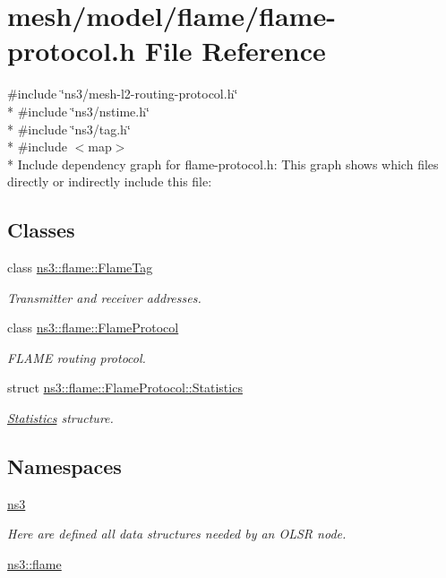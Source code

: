 \hypertarget{flame-protocol_8h}{}\section{mesh/model/flame/flame-\/protocol.h File Reference}
\label{flame-protocol_8h}
{\ttfamily \#include \char`\"{}ns3/mesh-\/l2-\/routing-\/protocol.\+h\char`\"{}}\\*
{\ttfamily \#include \char`\"{}ns3/nstime.\+h\char`\"{}}\\*
{\ttfamily \#include \char`\"{}ns3/tag.\+h\char`\"{}}\\*
{\ttfamily \#include $<$map$>$}\\*
Include dependency graph for flame-\/protocol.h\+:
This graph shows which files directly or indirectly include this file\+:
\subsection*{Classes}
\begin{DoxyCompactItemize}
\item 
class \hyperlink{classns3_1_1flame_1_1FlameTag}{ns3\+::flame\+::\+Flame\+Tag}
\begin{DoxyCompactList}\small\item\em Transmitter and receiver addresses. \end{DoxyCompactList}\item 
class \hyperlink{classns3_1_1flame_1_1FlameProtocol}{ns3\+::flame\+::\+Flame\+Protocol}
\begin{DoxyCompactList}\small\item\em F\+L\+A\+ME routing protocol. \end{DoxyCompactList}\item 
struct \hyperlink{structns3_1_1flame_1_1FlameProtocol_1_1Statistics}{ns3\+::flame\+::\+Flame\+Protocol\+::\+Statistics}
\begin{DoxyCompactList}\small\item\em \hyperlink{structns3_1_1flame_1_1FlameProtocol_1_1Statistics}{Statistics} structure. \end{DoxyCompactList}\end{DoxyCompactItemize}
\subsection*{Namespaces}
\begin{DoxyCompactItemize}
\item 
 \hyperlink{namespacens3}{ns3}
\begin{DoxyCompactList}\small\item\em Here are defined all data structures needed by an O\+L\+SR node. \end{DoxyCompactList}\item 
 \hyperlink{namespacens3_1_1flame}{ns3\+::flame}
\end{DoxyCompactItemize}
